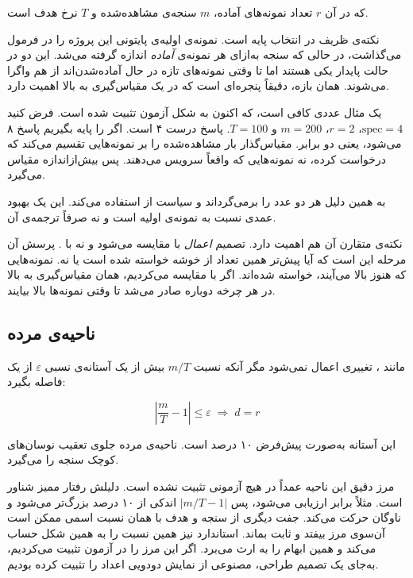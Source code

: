 که در آن $r$ تعداد نمونه‌های آماده، $m$ سنجه‌ی مشاهده‌شده و $T$ نرخ هدف است.

نکته‌ی ظریف در انتخاب پایه است. نمونه‌ی اولیه‌ی پایتونی این پروژه  را در
فرمول می‌گذاشت، در حالی که سنجه به‌ازای هر نمونه‌ی \emph{آماده} اندازه گرفته می‌شد. این دو در
حالت پایدار یکی هستند اما تا وقتی نمونه‌های تازه در حال آماده‌شدن‌اند از هم واگرا می‌شوند.
همان بازه، دقیقاً پنجره‌ای است که در یک مقیاس‌گیری به بالا اهمیت دارد.

یک مثال عددی کافی است، که اکنون به شکل آزمون  تثبیت شده
است. فرض کنید $\mathrm{spec} = 4$، $r = 2$، $m = 200$ و $T = 100$. پاسخ درست ۴ است. اگر
 را پایه بگیریم پاسخ ۸ می‌شود، یعنی دو برابر. مقیاس‌گذار بار مشاهده‌شده را بر
نمونه‌هایی تقسیم می‌کند که درخواست کرده، نه نمونه‌هایی که واقعاً سرویس می‌دهند. پس
بیش‌ازاندازه مقیاس می‌گیرد.

به همین دلیل  هر دو عدد را برمی‌گرداند و سیاست از  استفاده می‌کند.
این یک بهبود عمدی نسبت به نمونه‌ی اولیه است و نه صرفاً ترجمه‌ی آن.

نکته‌ی متقارن آن هم اهمیت دارد. تصمیم \emph{اعمال} با  مقایسه می‌شود و نه
با . پرسش آن مرحله این است که آیا پیش‌تر همین تعداد از خوشه خواسته شده است یا نه.
نمونه‌هایی که هنوز بالا می‌آیند، خواسته شده‌اند. اگر با  مقایسه می‌کردیم، همان
مقیاس‌گیری به بالا در هر چرخه دوباره صادر می‌شد تا وقتی نمونه‌ها بالا بیایند.

\subsection{ناحیه‌ی مرده}
\label{sec:design-deadband}

مانند ، تغییری اعمال نمی‌شود مگر آنکه نسبت $m/T$ بیش از یک آستانه‌ی نسبی $\varepsilon$
از یک فاصله بگیرد:

\begin{equation}
\label{eq:deadband}
\left| \frac{m}{T} - 1 \right| \le \varepsilon \;\Longrightarrow\; d = r
\end{equation}

این آستانه به‌صورت پیش‌فرض ۱۰ درصد است. ناحیه‌ی مرده جلوی تعقیب نوسان‌های کوچک سنجه را
می‌گیرد.

مرز دقیق این ناحیه عمداً در هیچ آزمونی تثبیت نشده است. دلیلش رفتار ممیز شناور است. مثلاً
 برابر  ارزیابی می‌شود، پس $|m/T - 1|$ اندکی از ۱۰ درصد
بزرگ‌تر می‌شود و ناوگان حرکت می‌کند. جفت دیگری از سنجه و هدف با همان نسبت اسمی ممکن است
آن‌سوی مرز بیفتد و ثابت بماند.  استاندارد نیز همین نسبت را به همین شکل حساب می‌کند و
همین ابهام را به ارث می‌برد. اگر این مرز را در آزمون تثبیت می‌کردیم، به‌جای یک تصمیم طراحی،
مصنوعی از نمایش دودویی اعداد را تثبیت کرده بودیم.

